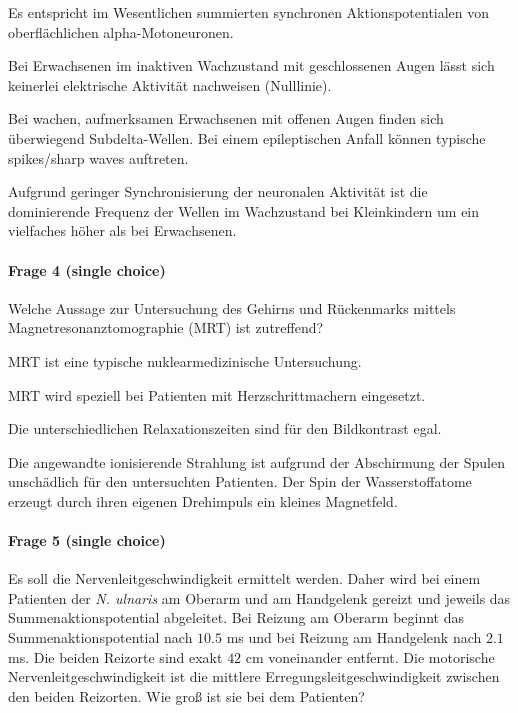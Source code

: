\begin{benumerate}
  \item Es entspricht im Wesentlichen summierten synchronen Aktionspotentialen von oberflächlichen alpha-Motoneuronen.
  \item Bei Erwachsenen im inaktiven Wachzustand mit geschlossenen Augen lässt sich keinerlei elektrische Aktivität nachweisen (Nulllinie).
  \item Bei wachen, aufmerksamen Erwachsenen mit offenen Augen finden sich überwiegend Subdelta-Wellen.
  \bolditem Bei einem epileptischen Anfall können typische spikes/sharp waves auftreten.
  \item Aufgrund geringer Synchronisierung der neuronalen Aktivität ist die dominierende Frequenz der Wellen im Wachzustand bei Kleinkindern um ein vielfaches höher als bei Erwachsenen.
\end{benumerate}

\paragraph{Frage 4 (single choice)}

Welche Aussage zur Untersuchung des Gehirns und Rückenmarks mittels Magnetresonanztomographie (MRT) ist zutreffend?
\begin{benumerate}
  \item MRT ist eine typische nuklearmedizinische Untersuchung.
  \item MRT wird speziell bei Patienten mit Herzschrittmachern eingesetzt.
  \item Die unterschiedlichen Relaxationszeiten sind für den Bildkontrast egal.
  \item Die angewandte ionisierende Strahlung ist aufgrund der Abschirmung der Spulen unschädlich für den untersuchten Patienten.
  \bolditem Der Spin der Wasserstoffatome erzeugt durch ihren eigenen Drehimpuls ein kleines Magnetfeld.
\end{benumerate}

\paragraph{Frage 5 (single choice)}

Es soll die Nervenleitgeschwindigkeit ermittelt werden. Daher wird bei einem Patienten der \emph{N. ulnaris} am Oberarm und am Handgelenk gereizt und jeweils das Summenaktionspotential abgeleitet. Bei Reizung am Oberarm beginnt das Summenaktionspotential nach \( 10.5 \) ms und bei Reizung am Handgelenk nach \( 2.1 \) ms. Die beiden Reizorte sind exakt \( 42 \) cm voneinander entfernt. Die motorische Nervenleitgeschwindigkeit ist die mittlere Erregungsleitgeschwindigkeit zwischen den beiden Reizorten. Wie groß ist sie bei dem Patienten?

